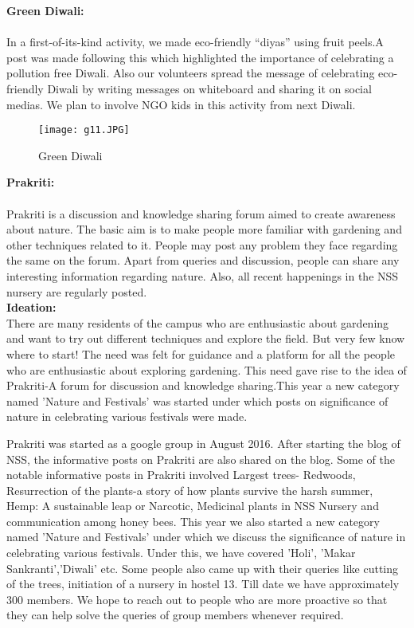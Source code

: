 \noindent \textbf{\Large Green Diwali:}\\ \\ In a first-of-its-kind activity, we made eco-friendly “diyas” using fruit peels.A post was made following this which highlighted the importance of celebrating a pollution free Diwali. Also our volunteers spread the message of celebrating eco-friendly Diwali by writing messages on whiteboard and sharing it on social medias. We plan to involve NGO kids in this activity from next Diwali.\\


\begin{figure}[H]
\centering
\texttt{[image: g11.JPG]}
\caption*{Green Diwali}
\end{figure}

\noindent \textbf{\Large Prakriti:}\\ \\Prakriti is a discussion and knowledge sharing forum aimed to create awareness about nature. The basic aim is to make people more familiar with gardening and other techniques related to it. People may post any problem they face regarding the same on the forum. Apart from queries and discussion, people can share any interesting information regarding nature. Also, all recent happenings in the NSS nursery are regularly posted.\\

\noindent \textbf{Ideation:\linebreak}\\ {There are many residents of the campus who are enthusiastic about gardening and want to try out different techniques and explore the field. But very few know where to start! The need was felt for guidance and a platform for all the people who are enthusiastic about exploring gardening. This need gave rise to the idea of Prakriti-A forum for discussion and knowledge sharing.This year a new category named 'Nature and Festivals' was started under which posts on significance of nature in celebrating various festivals were made. }

\noindent \linebreak Prakriti was started as a google group in August 2016. After starting the blog of NSS, the informative posts on Prakriti are also shared on the blog. Some of the notable informative posts in Prakriti involved Largest trees- Redwoods, Resurrection of the plants-a story of how plants survive the harsh summer, Hemp: A sustainable leap or Narcotic, Medicinal plants in NSS Nursery and communication among honey bees. This year we also started a new category named 'Nature and Festivals' under which we discuss the significance of nature in celebrating various festivals. Under this, we have covered 'Holi', 'Makar Sankranti','Diwali' etc. Some people also came up with their queries like cutting of the trees, initiation of a nursery in hostel 13. Till date we have approximately 300 members. We hope to reach out to people who are more proactive so that they can help solve the queries of group members whenever required.


